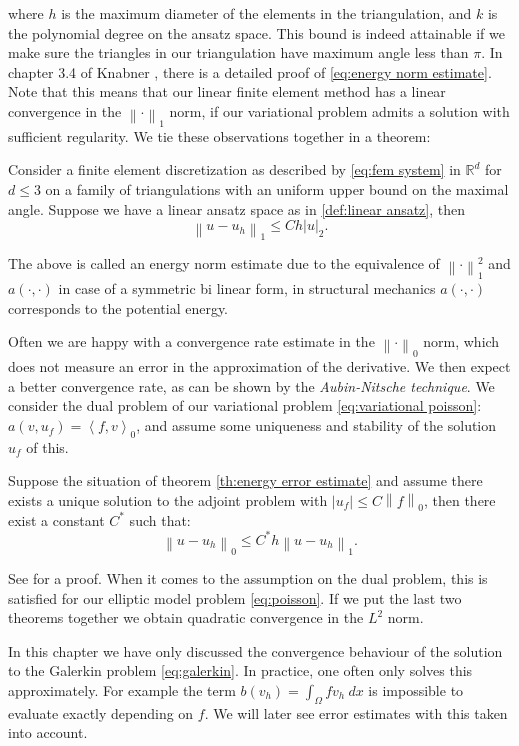 \documentclass[../Main/main.tex]{subfiles}
\begin{document}
	where $h$ is the maximum diameter of the elements in the triangulation, and $k$ is the polynomial degree on the ansatz space.
	This bound is indeed attainable if we make sure the triangles in our triangulation have maximum angle less than $\pi$.
	In chapter 3.4 of Knabner \cite{Knabner}, there is a detailed proof of \eqref{eq:energy norm estimate}.\\
	Note that this means that our linear finite element method has a linear convergence in the $\left \| \cdot \right \|_1$ norm, if our variational problem admits a solution with sufficient regularity. We tie these observations together in a theorem:
	\begin{theorem}\label{th:energy error estimate}
		Consider a finite element discretization as described by \eqref{eq:fem system} in $\mathbb{R}^d$ for $d\leq 3$ on a family of triangulations with an uniform upper bound on the maximal angle. Suppose we have a linear ansatz space as in \ref{def:linear ansatz}, then
		\begin{equation}
			\left \| u-u_h \right \|_{1}\leq C h|u|_{2}.
		\end{equation}
	\end{theorem}
	The above is called an energy norm estimate due to the equivalence of $\left \|\cdot\right\|_1^2$ and $a(\cdot,\cdot)$ in case of a symmetric bi linear form, in structural mechanics $a(\cdot,\cdot)$ corresponds to the potential energy. \par
	Often we are happy with a convergence rate estimate in the $\left \| \cdot \right \|_0$ norm, which does not measure an error in the approximation of the derivative. We then expect a better convergence rate, as can be shown by the  \emph{Aubin-Nitsche technique}. We consider the dual problem of our variational problem \eqref{eq:variational poisson}: $a(v,u_f) = \left \langle f,v\right \rangle_0$, and assume some uniqueness and stability of the solution $u_f$ of this. 
	\begin{theorem}[$L^2$ estimate]
		Suppose the situation of theorem \ref{th:energy error estimate} and assume there exists a unique solution to the adjoint problem with $| u_f| \leq C \left \|f \right \|_0$, then there exist a constant $C^*$ such that:
		\begin{equation}
			\left \| u - u_h \right \|_0 \leq C^* h \left \| u- u_h \right \|_1.
		\end{equation}
	\end{theorem}
	See \cite{Knabner} for a proof. When it comes to the assumption on the dual problem, this is satisfied for our elliptic model problem \ref{eq:poisson}. If we put the last two theorems together we obtain quadratic convergence in the $L^2$ norm.
	\begin{remark}
		In this chapter we have only discussed the convergence behaviour of the solution to the Galerkin problem \eqref{eq:galerkin}. In practice, one often only solves this approximately. For example the term  $b(v_h)=\int_{\Omega}fv_h \ dx$ is impossible to evaluate exactly depending on $f$. We will later see error estimates with this taken into account.
	\end{remark}
\end{document}
